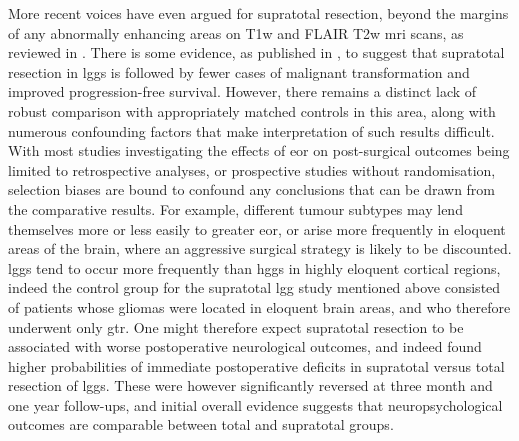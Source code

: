 More recent voices have even argued for supratotal resection, beyond the margins of any abnormally enhancing areas on T1w and FLAIR T2w \gls{mri} scans, as reviewed in \textcite{deLeeuw2019}.
There is some evidence, as published in \textcite{Yordanova2011}, to suggest that supratotal resection in \glspl{lgg} is followed by fewer cases of malignant transformation and improved progression-free survival.
However, there remains a distinct lack of robust comparison with appropriately matched controls in this area, along with numerous confounding factors that make interpretation of such results difficult.
With most studies investigating the effects of \gls{eor} on post-surgical outcomes being limited to retrospective analyses, or prospective studies without randomisation, selection biases are bound to confound any conclusions that can be drawn from the comparative results\autocite{deLeeuw2019,Keles2001}.
For example, different tumour subtypes may lend themselves more or less easily to greater \gls{eor}, or arise more frequently in eloquent areas of the brain, where an aggressive surgical strategy is likely to be discounted\autocite{deLeeuw2019}.
\Glspl{lgg} tend to occur more frequently than \glspl{hgg} in highly eloquent cortical regions\autocite{Duffau2004}, indeed the control group for the supratotal \gls{lgg} study\autocite{Yordanova2011} mentioned above consisted of patients whose gliomas were located in eloquent brain areas, and who therefore underwent only \gls{gtr}.
One might therefore expect supratotal resection to be associated with worse postoperative neurological outcomes, and indeed \textcite{Rossi2019a} found higher probabilities of immediate postoperative deficits in supratotal versus total resection of \glspl{lgg}.
These were however significantly reversed at three month and one year follow-ups, and initial overall evidence suggests that neuropsychological outcomes are comparable between total and supratotal groups\autocite{Tabor2021}.

